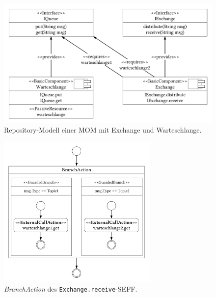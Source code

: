 \begin{figure}
\center
  \includegraphics[width=1\textwidth]{images/modelling/modelingRepository.pdf}
  \caption{Repository-Modell einer MOM mit Exchange und Warteschlange.}
  \label{img:mom_repository}
\end{figure}

\begin{figure}
\center
  \includegraphics[width=0.7\textwidth]{images/modelling/modelingGuardedBranch.pdf}
  \caption{\emph{BranchAction} des \texttt{Exchange.receive}-SEFF.}
  \label{img:queueBranch}
\end{figure}

